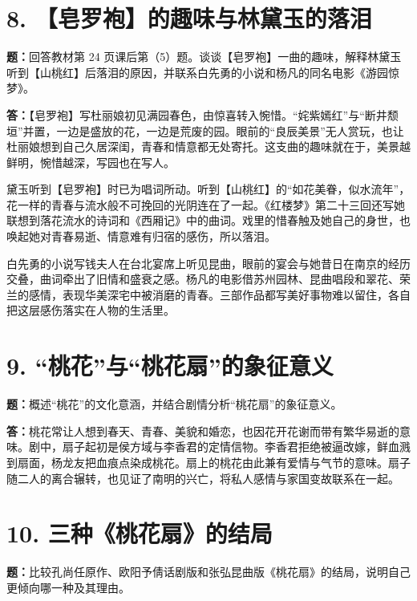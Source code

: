\documentclass[11pt,a4paper,fontset=windows]{ctexart}
\newenvironment{answer}{\par\begingroup\answerlatin\answercjk}{\par\endgroup}
\begin{document}
\section*{8. 【皂罗袍】的趣味与林黛玉的落泪}

\textbf{题：}回答教材第 24 页课后第（5）题。谈谈【皂罗袍】一曲的趣味，解释林黛玉听到【山桃红】后落泪的原因，并联系白先勇的小说和杨凡的同名电影《游园惊梦》。

\begin{answer}
\textbf{答：}【皂罗袍】写杜丽娘初见满园春色，由惊喜转入惋惜。“姹紫嫣红”与“断井颓垣”并置，一边是盛放的花，一边是荒废的园。眼前的“良辰美景”无人赏玩，也让杜丽娘想到自己久居深闺，青春和情意都无处寄托。这支曲的趣味就在于，美景越鲜明，惋惜越深，写园也在写人。

黛玉听到【皂罗袍】时已为唱词所动。听到【山桃红】的“如花美眷，似水流年”，花一样的青春与流水般不可挽回的光阴连在了一起。《红楼梦》第二十三回还写她联想到落花流水的诗词和《西厢记》中的曲词。戏里的惜春触及她自己的身世，也唤起她对青春易逝、情意难有归宿的感伤，所以落泪。

白先勇的小说写钱夫人在台北宴席上听见昆曲，眼前的宴会与她昔日在南京的经历交叠，曲词牵出了旧情和盛衰之感。杨凡的电影借苏州园林、昆曲唱段和翠花、荣兰的感情，表现华美深宅中被消磨的青春。三部作品都写美好事物难以留住，各自把这层感伤落实在人物的生活里。

\end{answer}
\section*{9. “桃花”与“桃花扇”的象征意义}

\textbf{题：}概述“桃花”的文化意涵，并结合剧情分析“桃花扇”的象征意义。

\begin{answer}
\textbf{答：}桃花常让人想到春天、青春、美貌和婚恋，也因花开花谢而带有繁华易逝的意味。剧中，扇子起初是侯方域与李香君的定情信物。李香君拒绝被逼改嫁，鲜血溅到扇面，杨龙友把血痕点染成桃花。扇上的桃花由此兼有爱情与气节的意味。扇子随二人的离合辗转，也见证了南明的兴亡，将私人感情与家国变故联系在一起。

\end{answer}
\section*{10. 三种《桃花扇》的结局}

\textbf{题：}比较孔尚任原作、欧阳予倩话剧版和张弘昆曲版《桃花扇》的结局，说明自己更倾向哪一种及其理由。
\end{document}
